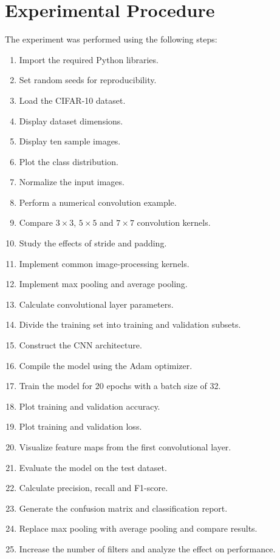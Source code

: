 \documentclass[11pt]{article}
\begin{document}
\section{Experimental Procedure}
The experiment was performed using the following steps:
\begin{enumerate}
    \item Import the required Python libraries.
    \item Set random seeds for reproducibility.
    \item Load the CIFAR-10 dataset.
    \item Display dataset dimensions.
    \item Display ten sample images.
    \item Plot the class distribution.
    \item Normalize the input images.
    \item Perform a numerical convolution example.
    \item Compare $3\times3$, $5\times5$ and $7\times7$ convolution kernels.
    \item Study the effects of stride and padding.
    \item Implement common image-processing kernels.
    \item Implement max pooling and average pooling.
    \item Calculate convolutional layer parameters.
    \item Divide the training set into training and validation subsets.
    \item Construct the CNN architecture.
    \item Compile the model using the Adam optimizer.
    \item Train the model for 20 epochs with a batch size of 32.
    \item Plot training and validation accuracy.
    \item Plot training and validation loss.
    \item Visualize feature maps from the first convolutional layer.
    \item Evaluate the model on the test dataset.
    \item Calculate precision, recall and F1-score.
    \item Generate the confusion matrix and classification report.
    \item Replace max pooling with average pooling and compare results.
    \item Increase the number of filters and analyze the effect on performance.
\end{enumerate}
\end{document}
